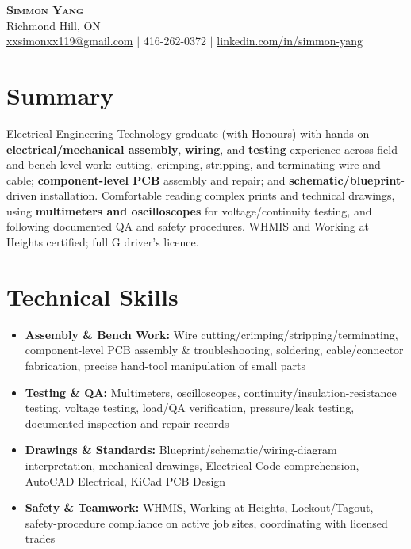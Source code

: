 \documentclass[letterpaper,11pt]{article}
\begin{document}
\begin{center}
    \textbf{\Huge \scshape Simmon Yang} \\ \vspace{1pt}
    Richmond Hill, ON \\
    \href{mailto:xxsimonxx119@gmail.com}{xxsimonxx119@gmail.com} $|$ 416-262-0372 $|$
    \href{https://www.linkedin.com/in/simmon-yang/}{linkedin.com/in/simmon-yang}
\end{center}

\section{Summary}
Electrical Engineering Technology graduate (with Honours) with hands-on \textbf{electrical/mechanical assembly}, \textbf{wiring}, and \textbf{testing} experience across field and bench-level work: cutting, crimping, stripping, and terminating wire and cable; \textbf{component-level PCB} assembly and repair; and \textbf{schematic/blueprint}-driven installation. Comfortable reading complex prints and technical drawings, using \textbf{multimeters and oscilloscopes} for voltage/continuity testing, and following documented QA and safety procedures. WHMIS and Working at Heights certified; full G driver's licence.

\section{Technical Skills}
\begin{itemize}[leftmargin=0.15in]
  \item \textbf{Assembly \& Bench Work:} Wire cutting/crimping/stripping/terminating, component-level PCB assembly \& troubleshooting, soldering, cable/connector fabrication, precise hand-tool manipulation of small parts
  \item \textbf{Testing \& QA:} Multimeters, oscilloscopes, continuity/insulation-resistance testing, voltage testing, load/QA verification, pressure/leak testing, documented inspection and repair records
  \item \textbf{Drawings \& Standards:} Blueprint/schematic/wiring-diagram interpretation, mechanical drawings, Electrical Code comprehension, AutoCAD Electrical, KiCad PCB Design
  \item \textbf{Safety \& Teamwork:} WHMIS, Working at Heights, Lockout/Tagout, safety-procedure compliance on active job sites, coordinating with licensed trades
\end{itemize}
\end{document}
